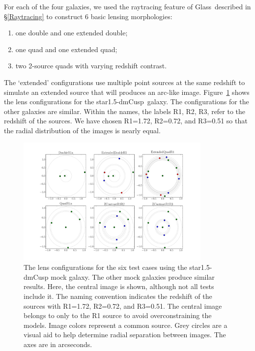 \documentclass[galley,usenatbib]{mn2e}
\newcommand{\Glass}{{\sc Glass}}
\newcommand{\figref}[1] {Figure~\ref{#1}}
\newcommand{\secref}[1] {\S\ref{#1}}
\newcommand{\mockBC}{{\sc star1.5-dmCusp}}
\begin{document}
For each of the four galaxies, we used the raytracing feature of \Glass\
described in \secref{Raytracing} to construct 6 basic lensing morphologies:

\begin{enumerate}
\item one double and one extended double;
\item one quad and one extended quad;
\item two 2-source quads with varying redshift contrast.
\end{enumerate}
The `extended' configurations use multiple point sources at the same redshift
to simulate an extended source that will produces an arc-like image.
\figref{arrival surfaces} shows the lens configurations for the \mockBC\
galaxy.  The configurations for the other galaxies are similar. Within the
names, the labels R1, R2, R3, refer to the redshift of the sources. We have
chosen R1=1.72, R2=0.72, and R3=0.51 so that the radial distribution of the
images is nearly equal.

\begin{figure}
\includegraphics[width=0.85\textwidth]{BCarrival_surfaces}
\caption{The lens configurations for the six test cases using the \mockBC{}
mock galaxy. The other mock galaxies produce similar results. Here, the central
image is shown, although not all tests include it. The naming convention
indicates the redshift of the sources with R1=1.72, R2=0.72, and R3=0.51.  The
central image belongs to only to the R1 source to avoid overconstraining the
models. Image colors represent a common source. Grey circles are a visual aid to help determine radial
separation between images. The axes are in arcseconds.}
\label{arrival surfaces}
\end{figure}
\end{document}
